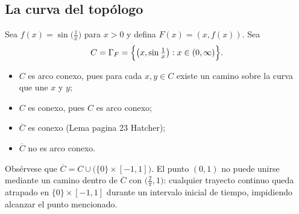 
\subsection{La curva del topólogo}

Sea $f(x)=\sin\!\bigl(\tfrac1x\bigr)$ para $x>0$ y defina $F(x)=(x,f(x))$.  
Sea
\begin{align*}
C=\Gamma_F=\Bigl\{\bigl(x,\sin\tfrac1x\bigr):x\in(0,\infty)\Bigr\}.
\end{align*}


\begin{center}
  \end{center}
  

\begin{itemize}
  \item $C$ es arco conexo, pues para cada $x,y\in C$ existe un camino sobre la curva que une $x$ y $y$;
  \item $C$ es conexo, pues $C$ es arco conexo;
  \item $\overline{C}$ es conexo (Lema pagina 23 Hatcher);
  \item $\overline{C}$ no es arco conexo.
\end{itemize}

Obsérvese que $\overline{C}=C\cup\bigl(\{0\}\times[-1,1]\bigr)$.  
El punto $(0,1)$ no puede unirse mediante un camino dentro de $\overline{C}$ con $\bigl(\tfrac2\pi,1\bigr)$: cualquier trayecto continuo queda atrapado en $\{0\}\times[-1,1]$ durante un intervalo inicial de tiempo, impidiendo alcanzar el punto mencionado.
